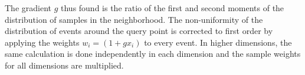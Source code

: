 The gradient $g$ thus found is the ratio of the first and second moments of the distribution of samples in the neighborhood.
The non-uniformity of the distribution of events around the query point is corrected to first order by applying the weights $w_i = (1 + gx_i)$ to every event.
In higher dimensions, the same calculation is done independently in each dimension and the sample weights for all dimensions are multiplied.
%

